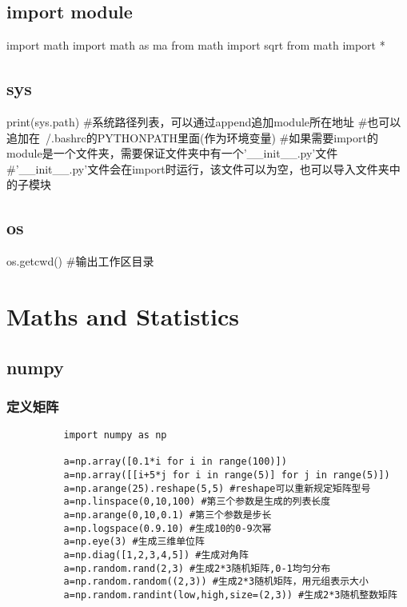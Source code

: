 \documentclass{article}
\begin{document}
    \subsection{import module}
      \begin{codeblock}[language=python, caption={import module}]
        import math
        import math as ma
        from math import sqrt
        from math import *
      \end{codeblock}

    \subsection{sys}
      \begin{codeblock}[language=python, caption={sys module}]
        print(sys.path)
        #系统路径列表，可以通过append追加module所在地址
        #也可以追加在~/.bashrc的PYTHONPATH里面(作为环境变量)
        #如果需要import的module是一个文件夹，需要保证文件夹中有一个'__init__.py'文件
        #'__init__.py'文件会在import时运行，该文件可以为空，也可以导入文件夹中的子模块
      \end{codeblock}

    \subsection{os}
      \begin{codeblock}[language=python, caption={os module}]
        os.getcwd() #输出工作区目录
      \end{codeblock}

  \section{Maths and Statistics}

    \subsection{numpy}
      \subsubsection{定义矩阵}
        \begin{lstlisting}
          import numpy as np

          a=np.array([0.1*i for i in range(100)])
          a=np.array([[i+5*j for i in range(5)] for j in range(5)])
          a=np.arange(25).reshape(5,5) #reshape可以重新规定矩阵型号
          a=np.linspace(0,10,100) #第三个参数是生成的列表长度
          a=np.arange(0,10,0.1) #第三个参数是步长
          a=np.logspace(0.9.10) #生成10的0-9次幂
          a=np.eye(3) #生成三维单位阵
          a=np.diag([1,2,3,4,5]) #生成对角阵
          a=np.random.rand(2,3) #生成2*3随机矩阵,0-1均匀分布
          a=np.random.random((2,3)) #生成2*3随机矩阵，用元组表示大小
          a=np.random.randint(low,high,size=(2,3)) #生成2*3随机整数矩阵
        \end{lstlisting}
\end{document}

